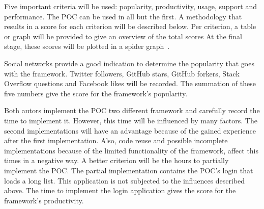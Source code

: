 \documentclass[a4paper]{artikel3}
\newcommand{\setspace}[0]{\vspace{2mm}}
\renewcommand{\paragraph}[1]{\setspace \noindent {\bf #1}  }
\begin{document}
Five important criteria will be used:  popularity,  productivity,  usage,  support and performance. 
The POC can be used in all but the first.   
A methodology that results in a score for each criterion will be described below.  
Per criterion,  a table or graph will be provided to give an overview of the total scores
At the final stage,  these scores will be plotted in a spider graph~\cite{Few2005}.   

\paragraph{Popularity}
Social networks provide a good indication to determine the popularity that goes with the framework.  
Twitter followers,  GitHub stars,  GitHub forkers,  Stack Overflow questions and Facebook likes will be recorded.
The summation of these five numbers give the score for the framework's popularity.  


\paragraph{Productivity}
Both autors implement the POC two different framework and carefully record the time to implement it.  
However,  this time will be influenced by many factors.
The second implementations will have an advantage because of the gained experience after the first implementation.
Also,  code reuse and possible incomplete implementations because of the limited functionality of the framework, affect this times in a negative way.
A better criterion will be the hours to partially implement the POC.  
The partial implementation contains the POC's login that loads a long list.
This application is not subjected to the influences described above. %
The time to implement the login application gives the score for the framework's productivity. 
\end{document}
